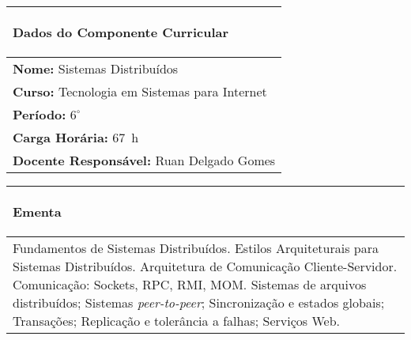 
\begin{table}[h!]

\centering
\begin{small} 
\setlength{\tabcolsep}{3pt} 
\begin{tabular}{|p{15cm}|}\hline


\begin{center}\textbf{Dados do Componente Curricular}\end{center}\\ \hline

\textbf{Nome:} Sistemas Distribuídos \\ \hline
\textbf{Curso:} Tecnologia em Sistemas para Internet \\ \hline
\textbf{Período:} $6^{\circ}$ \\ \hline
\textbf{Carga Horária:} 67~h \\ \hline
\textbf{Docente Responsável:} Ruan Delgado Gomes \\ \hline


\end{tabular} 
\end{small}
\label{dadosinstituicao}
\end{table} 

\begin{table}[h!]
\centering
\begin{small} 
\setlength{\tabcolsep}{1pt} 
\begin{tabular}{|p{15cm}|}\hline

\begin{center}\textbf{Ementa}\end{center}\\ \hline
Fundamentos de Sistemas Distribuídos. Estilos Arquiteturais para Sistemas Distribuídos. Arquitetura de Comunicação Cliente-Servidor. Comunicação: Sockets, RPC, RMI, MOM. Sistemas de arquivos distribuídos; Sistemas \textit{peer-to-peer}; Sincronização e estados globais; Transações; Replicação e tolerância a falhas; Serviços Web. \\ \hline

\end{tabular} 
\end{small}
\label{dadosinstituicao}
\end{table} 


